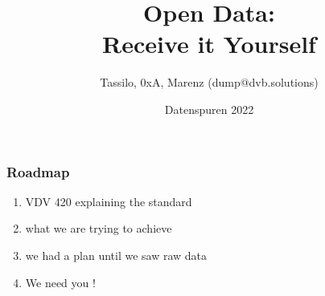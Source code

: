 \documentclass{beamer}
\title{Open Data: \\ Receive it Yourself}
\date[ISPN ’80]{Datenspuren 2022}
\author[]{Tassilo, 0xA, Marenz (dump@dvb.solutions)}
\begin{document}
\begin{frame}\titlepage
\end{frame}
  
\begin{frame} 
\frametitle{Roadmap} 

\begin{enumerate}
    \item VDV 420 explaining the standard
    \item what we are trying to achieve
    \item we had a plan until we saw raw data
    \item We need you !
\end{enumerate}

\end{frame}
\end{document}
